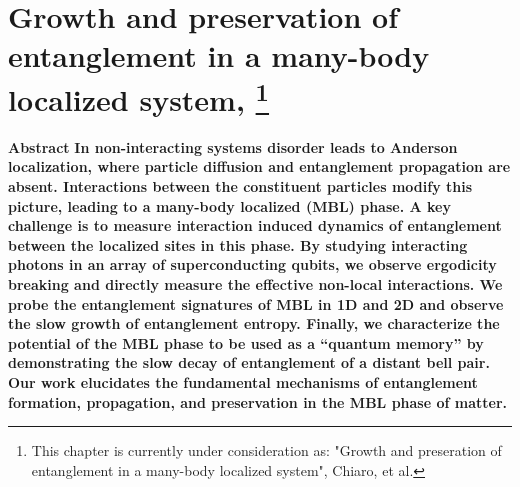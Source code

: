 %
\chapter[MBL]{Growth and preservation of entanglement in a many-body localized system,
\footnote{This chapter is currently under consideration as: "Growth and preseration of entanglement in a many-body localized system", Chiaro, et al.}}


{\textbf{\centering Abstract}}
\textbf{In non-interacting systems disorder leads to Anderson localization, where particle diffusion and entanglement propagation are absent.
Interactions between the constituent particles modify this picture, leading to a many-body localized (MBL) phase.
A key challenge is to measure interaction induced dynamics of entanglement between the localized sites in this phase.
By studying interacting photons in an array of superconducting qubits, we observe ergodicity breaking and directly measure the effective non-local interactions.
We probe the entanglement signatures of MBL in 1D and 2D and observe the slow growth of entanglement entropy.
Finally, we characterize the potential of the MBL phase to be used as a “quantum memory” by demonstrating the slow decay of entanglement of a distant bell pair.
Our work elucidates the fundamental mechanisms of entanglement formation, propagation, and preservation in the MBL phase of matter.}

